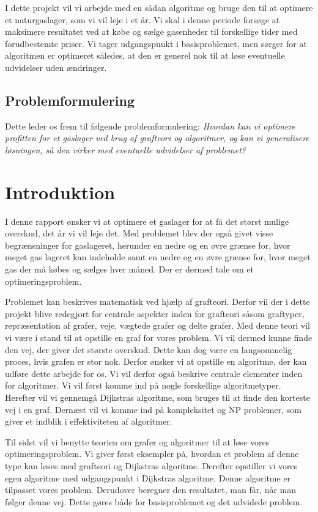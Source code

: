 I dette projekt vil vi arbejde med en sådan algoritme og bruge den til at optimere et naturgaslager, som vi vil leje i et år. Vi skal i denne periode forsøge at maksimere resultatet ved at købe og sælge gasenheder til forskellige tider med forudbestemte priser. Vi tager udgangspunkt i basisproblemet, men sørger for at algoritmen er optimeret således, at den er generel nok til at løse eventuelle udvidelser uden ændringer.

\subsection{Problemformulering}
Dette leder os frem til følgende problemformulering:
\textit{Hvordan kan vi optimere profitten for et gaslager ved brug af grafteori og algoritmer, og kan vi generalisere løsningen, så den virker med eventuelle udvidelser af problemet?}

\section{Introduktion}
I denne rapport ønsker vi at optimere et gaslager for at få det størst mulige overskud, det år vi vil leje det. Med problemet blev der også givet visse begrænsninger for gaslageret, herunder en nedre og en øvre grænse for, hvor meget gas lageret kan indeholde samt en nedre og en øvre grænse for, hvor meget gas der må købes og sælges hver måned. Der er dermed tale om et optimeringsproblem. 

Problemet kan beskrives matematisk ved hjælp af grafteori. Derfor vil der i dette projekt blive redegjort for centrale aspekter inden for grafteori såsom graftyper, repræsentation af grafer, veje, vægtede grafer og delte grafer. Med denne teori vil vi være i stand til at opstille en graf for vores problem. Vi vil dermed kunne finde den vej, der giver det største overskud. 
Dette kan dog være en langsommelig proces, hvis grafen er stor nok. Derfor ønsker vi at opstille en algoritme, der kan udføre dette arbejde for os. Vi vil derfor også beskrive centrale elementer inden for algoritmer. Vi vil først komme ind på nogle forskellige algoritmetyper. Herefter vil vi gennemgå Dijkstras algoritme, som bruges til at finde den korteste vej i en graf. Dernæst vil vi komme ind på kompleksitet og NP problemer, som giver et indblik i effektiviteten af algoritmer.

Til sidst vil vi benytte teorien om grafer og algoritmer til at løse vores optimeringsproblem. Vi giver først eksempler på, hvordan et problem af denne type kan løses med grafteori og Dijkstras algoritme. Derefter opstiller vi vores egen algoritme med udgangspunkt i Dijkstras algoritme. Denne algoritme er tilpasset vores problem. Derudover beregner den resultatet, man får, når man følger denne vej. Dette gøres både for basisproblemet og det udvidede problem.




